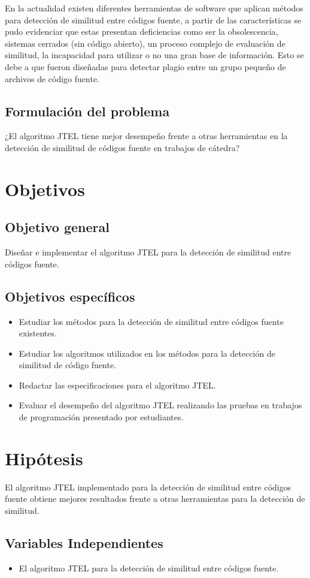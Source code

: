 En la actualidad existen diferentes herramientas de software que aplican métodos para detección de similitud entre códigos fuente, a partir de las características se pudo evidenciar que estas presentan deficiencias como ser la obsolescencia, sistemas cerrados (sin código abierto), un proceso complejo de evaluación de similitud, la incapacidad para utilizar o no una gran base de información. Esto se debe a que fueron diseñadas para detectar plagio entre un grupo pequeño de archivos de código fuente.
\subsection{Formulación del problema}
¿El algoritmo JTEL tiene mejor desempeño frente a otras herramientas en la detección de similitud de códigos fuente en trabajos de cátedra?

\section{Objetivos}
\subsection{Objetivo general}
Diseñar e implementar el algoritmo JTEL para la detección de similitud entre códigos fuente.
\subsection{Objetivos específicos}
\begin{itemize}
    \item Estudiar los métodos para la detección de similitud entre códigos fuente existentes.
    \item Estudiar los algoritmos utilizados en los métodos para la detección de similitud de código fuente.
    \item Redactar las especificaciones para el algoritmo JTEL.
    \item Evaluar el desempeño del algoritmo JTEL realizando las pruebas en trabajos de programación presentado por estudiantes.
\end{itemize}

\section{Hipótesis}
El algoritmo JTEL implementado para la detección de similitud entre códigos fuente obtiene mejores resultados frente a otras herramientas para la detección de similitud.
\subsection{Variables Independientes}
\begin{itemize}
    \item El algoritmo JTEL para la detección de similitud entre códigos fuente.
\end{itemize}
